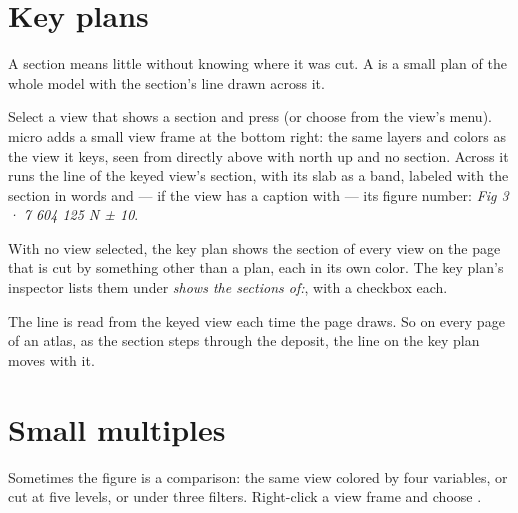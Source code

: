 
\section{Key plans}\label{sec:compo-keyplan}

A section means little without knowing where it was cut. A  is a small plan of the whole model with the section's line drawn across it.

Select a view that shows a section and press  (or choose  from the view's menu). micro adds a small view frame at the bottom right: the same layers and colors as the view it keys, seen from directly above with north up and no section. Across it runs the line of the keyed view's section, with its slab as a band, labeled with the section in words and — if the view has a caption with  — its figure number: \emph{Fig 3 · 7 604 125 N ± 10}.

With no view selected, the key plan shows the section of every view on the page that is cut by something other than a plan, each in its own color. The key plan's inspector lists them under \emph{shows the sections of:}, with a checkbox each.

The line is read from the keyed view each time the page draws. So on every page of an atlas, as the section steps through the deposit, the line on the key plan moves with it.


\section{Small multiples}\label{sec:compo-multiples}

Sometimes the figure is a comparison: the same view colored by four variables, or cut at five levels, or under three filters. Right-click a view frame and choose .

